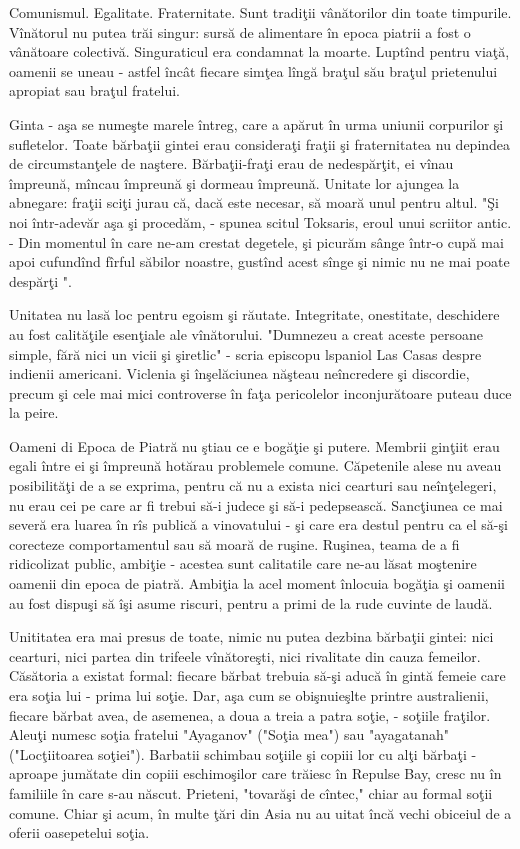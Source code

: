 Comunismul. Egalitate. Fraternitate. Sunt tradiţii vânătorilor  din toate timpurile. Vînătorul nu putea trăi singur: sursă de alimentare în epoca piatrii a fost o vânătoare colectivă. Singuraticul era  condamnat la moarte. Luptînd pentru viaţă, oamenii se uneau - astfel încât fiecare simţea lîngă braţul său braţul prietenului apropiat sau braţul fratelui.

Ginta - aşa se numeşte marele întreg, care a apărut în urma uniunii corpurilor şi sufletelor. Toate bărbaţii gintei erau consideraţi fraţii şi fraternitatea nu depindea de circumstanţele de naştere. Bărbaţii-fraţi erau de nedespărţit, ei vînau împreună, mîncau împreună şi  dormeau împreună. Unitate lor ajungea la abnegare: fraţii sciţi jurau că, dacă este necesar, să moară unul pentru altul. "Şi noi într-adevăr aşa şi procedăm, - spunea scitul Toksaris, eroul unui scriitor antic. - Din momentul în care ne-am crestat degetele, şi picurăm sânge într-o cupă mai apoi cufundînd fîrful săbilor noastre, gustînd acest sînge şi nimic nu ne mai poate despărţi ".

Unitatea nu lasă loc pentru egoism şi răutate. Integritate, onestitate, deschidere au fost calităţile esenţiale ale vînătorului. "Dumnezeu a creat aceste persoane simple, fără nici un vicii şi şiretlic" - scria episcopu lspaniol  Las Casas despre indienii americani. Viclenia şi înşelăciunea năşteau neîncredere şi discordie, precum şi cele mai mici controverse în faţa pericolelor inconjurătoare  puteau duce la peire.

Oameni di Epoca de Piatră nu ştiau ce e  bogăţie şi putere. Membrii ginţiit erau  egali între ei şi împreună hotărau problemele comune. Căpetenile alese nu  aveau posibilităţi de a se exprima, pentru că nu a exista nici cearturi sau neînţelegeri, nu erau  cei pe care ar fi trebui să-i judece şi să-i pedepsească. Sancţiunea ce mai severă era  luarea în rîs publică a vinovatului - şi care era destul pentru ca el să-şi corecteze comportamentul sau să moară de ruşine. Ruşinea, teama de a fi ridicolizat  public, ambiţie - acestea sunt calitatile care ne-au lăsat moştenire  oamenii din epoca de piatră. Ambiţia la acel moment înlocuia bogăţia şi oamenii au fost dispuşi să îşi asume riscuri, pentru a primi de la rude cuvinte de laudă.

Unititatea era  mai presus de toate, nimic nu putea dezbina bărbaţii gintei: nici cearturi, nici partea din trifeele vînătoreşti, nici rivalitate din cauza femeilor. Căsătoria a existat formal: fiecare bărbat trebuia să-şi aducă în gintă  femeie care era soţia lui - prima lui soţie. Dar, aşa cum se obişnuieşlte printre australienii, fiecare bărbat avea, de asemenea, a doua a treia a patra soţie, - soţiile fraţilor. Aleuţi numesc soţia fratelui "Ayaganov" ("Soţia mea") sau "ayagatanah" ("Locţiitoarea soţiei"). Barbatii schimbau soţiile şi copiii lor  cu alţi bărbaţi - aproape jumătate din copiii eschimoşilor care trăiesc în Repulse Bay, cresc nu în familiile în care s-au născut. Prieteni, "tovarăşi de cîntec," chiar au formal soţii comune. Chiar şi acum, în multe ţări din Asia nu au uitat încă vechi obiceiul de a oferii oasepetelui soţia.


